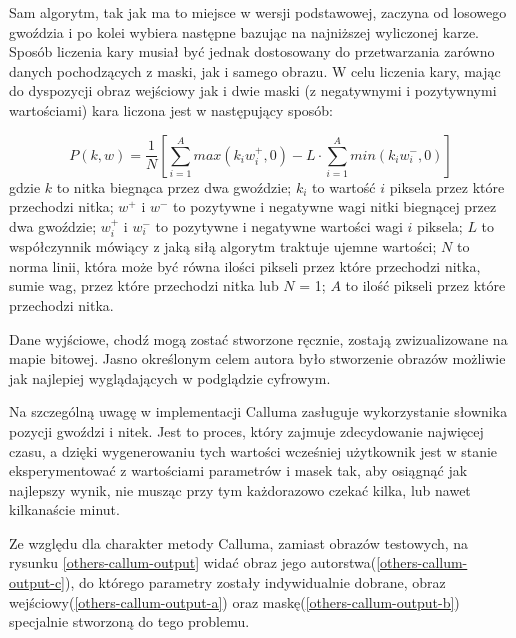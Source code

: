         Sam algorytm, tak jak ma to miejsce w wersji podstawowej, zaczyna od losowego gwoździa i po kolei wybiera następne bazując na najniższej wyliczonej karze. Sposób liczenia kary musiał być jednak dostosowany do przetwarzania zarówno danych pochodzących z maski, jak i samego obrazu. W celu liczenia kary, mając do dyspozycji obraz wejściowy jak i dwie maski (z negatywnymi i pozytywnymi wartościami) kara liczona jest w następujący sposób:
        
        \begin{equation} \label{others-callum-penalty}
            P(k, w) = \frac{1}{N} \left[ \sum_{i=1}^A max(k_i w_i^+, 0) - L \cdot \sum_{i=1}^A min(k_i w_i^-, 0) \right]
        \end{equation}
        gdzie \(k\) to nitka biegnąca przez dwa gwoździe; \(k_i\) to wartość \(i\) piksela przez które przechodzi nitka; \(w^+\) i \(w^-\) to pozytywne i negatywne wagi nitki biegnącej przez dwa gwoździe; \(w_i^+\) i \(w_i^-\) to pozytywne i negatywne wartości wagi \(i\) piksela; \(L\) to współczynnik mówiący z jaką siłą algorytm traktuje ujemne wartości; \(N\) to norma linii, która może być równa ilości pikseli przez które przechodzi nitka, sumie wag, przez które przechodzi nitka lub \(N\) = 1; \(A\) to ilość pikseli przez które przechodzi nitka.
        
        Dane wyjściowe, chodź mogą zostać stworzone ręcznie, zostają zwizualizowane na mapie bitowej. Jasno określonym celem autora było stworzenie obrazów możliwie jak najlepiej wyglądających w podglądzie cyfrowym. 
        
        \newpage
        Na szczególną uwagę w implementacji Calluma zasługuje wykorzystanie słownika pozycji gwoździ i nitek. Jest to proces, który zajmuje zdecydowanie najwięcej czasu, a dzięki wygenerowaniu tych wartości wcześniej użytkownik jest w stanie eksperymentować z wartościami parametrów i masek tak, aby osiągnąć jak najlepszy wynik, nie musząc przy tym każdorazowo czekać kilka, lub nawet kilkanaście minut. 
        
        Ze względu dla charakter metody Calluma, zamiast obrazów testowych, na rysunku \ref{others-callum-output} widać obraz jego autorstwa(\ref{others-callum-output-c}), do którego parametry zostały indywidualnie dobrane, obraz wejściowy(\ref{others-callum-output-a}) oraz maskę(\ref{others-callum-output-b}) specjalnie stworzoną do tego problemu. 
        
